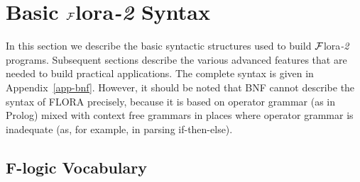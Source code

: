 \documentclass[11pt]{article}
\newcommand{\FLORA}{{\mbox{\sc ${\cal F}${lora}\rm\emph{-2}}}\xspace}
\newcommand{\fl}{\mbox{F-logic}\xspace}
\begin{document}
\section{Basic \FLORA Syntax}

In this section we describe the basic syntactic structures used to build
\FLORA programs. Subsequent sections describe the various advanced features
that are needed to build practical applications. The complete syntax is
given in Appendix~\ref{app-bnf}. However, it should be noted that BNF
cannot describe the syntax of FLORA precisely, because it is based on
operator grammar (as in Prolog) mixed with context free grammars in
places where operator grammar is inadequate (as, for example, in parsing
if-then-else).

\subsection{\fl Vocabulary}\label{sec-basic-flogic}
\end{document}
